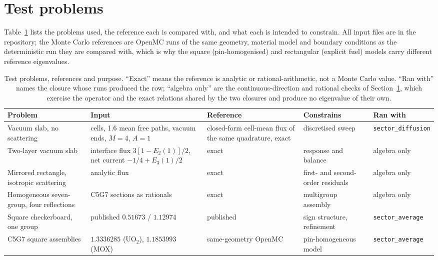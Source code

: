 \documentclass[11pt,a4paper]{article}
\begin{document}
\section{Test problems}
\label{sec:tests}

Table~\ref{tab:tests} lists the problems used, the reference each is compared with,
and what each is intended to constrain. All input files are in the repository; the
Monte Carlo references are OpenMC \cite{openmc2015} runs of the same geometry,
material model and boundary conditions as the deterministic run they are compared
with, which is why the square (pin-homogenised) and rectangular (explicit fuel)
models carry different reference eigenvalues.

\begin{table}[htbp]
\centering
\caption{Test problems, references and purpose. ``Exact'' means the reference is
analytic or rational-arithmetic, not a Monte Carlo value. ``Ran with'' names the
closure whose runs produced the row; ``algebra only'' are the continuous-direction and
rational checks of Section~\ref{sec:tests}, which exercise the operator and the exact
relations shared by the two closures and produce no eigenvalue of their own.}
\label{tab:tests}
\centering\small
\setlength{\tabcolsep}{4pt}
\begin{tabular}{@{}>{\raggedright\arraybackslash}p{2.8cm} >{\raggedright\arraybackslash}p{3.4cm} >{\raggedright\arraybackslash}p{2.9cm} >{\raggedright\arraybackslash}p{2.8cm} >{\raggedright\arraybackslash}p{2.3cm}@{}}
\hline
Problem & Input & Reference & Constrains & Ran with \\
\hline
Vacuum slab, no scattering & 32 cells, 1.6 mean free paths, vacuum ends, $M{=}4$, $A{=}1$ & closed-form cell-mean flux of the same quadrature, exact & discretised sweep & \texttt{sector\_\allowbreak diffusion} \\
Two-layer vacuum slab & interface flux $3[1-E_2(1)]/2$, net current $-1/4+E_3(1)/2$ & exact & response and balance & algebra only \\
Mirrored rectangle, isotropic scattering & analytic flux & exact & first- and second-order residuals & algebra only \\
Homogeneous seven-group, four reflections & C5G7 sections as rationals & exact & multigroup assembly & algebra only \\
Square checkerboard, one group & published $0.51673$ / $1.12974$ \cite{psn2027} & published & sign structure, refinement & \texttt{sector\_\allowbreak average} \\
C5G7 square assemblies & $1.3336285$ (UO$_2$), $1.1853993$ (MOX) & same-geometry OpenMC & pin-homogeneous model & \texttt{sector\_\allowbreak average} \\

\end{tabular}
\end{table}
\end{document}
